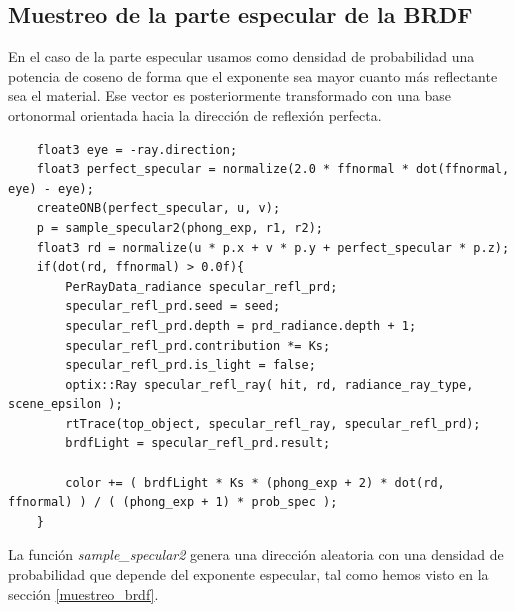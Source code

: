 \clearpage

\subsection{Muestreo de la parte especular de la BRDF}

En el caso de la parte especular usamos como densidad de probabilidad una potencia de coseno de forma que el exponente sea mayor cuanto más reflectante sea el material. Ese vector es posteriormente transformado con una base ortonormal orientada hacia la dirección de reflexión perfecta.

\begin{lstlisting}
	float3 eye = -ray.direction;
	float3 perfect_specular = normalize(2.0 * ffnormal * dot(ffnormal, eye) - eye);
	createONB(perfect_specular, u, v);
	p = sample_specular2(phong_exp, r1, r2);
	float3 rd = normalize(u * p.x + v * p.y + perfect_specular * p.z);
	if(dot(rd, ffnormal) > 0.0f){
		PerRayData_radiance specular_refl_prd;
		specular_refl_prd.seed = seed;
		specular_refl_prd.depth = prd_radiance.depth + 1;
		specular_refl_prd.contribution *= Ks;
		specular_refl_prd.is_light = false;
		optix::Ray specular_refl_ray( hit, rd, radiance_ray_type, scene_epsilon );
		rtTrace(top_object, specular_refl_ray, specular_refl_prd);
		brdfLight = specular_refl_prd.result;
				
		color += ( brdfLight * Ks * (phong_exp + 2) * dot(rd, ffnormal) ) / ( (phong_exp + 1) * prob_spec );
	}

\end{lstlisting}

La función \emph{sample\_specular2} genera una dirección aleatoria con una densidad de probabilidad que depende del exponente especular, tal como hemos visto en la sección \ref{muestreo_brdf}.

